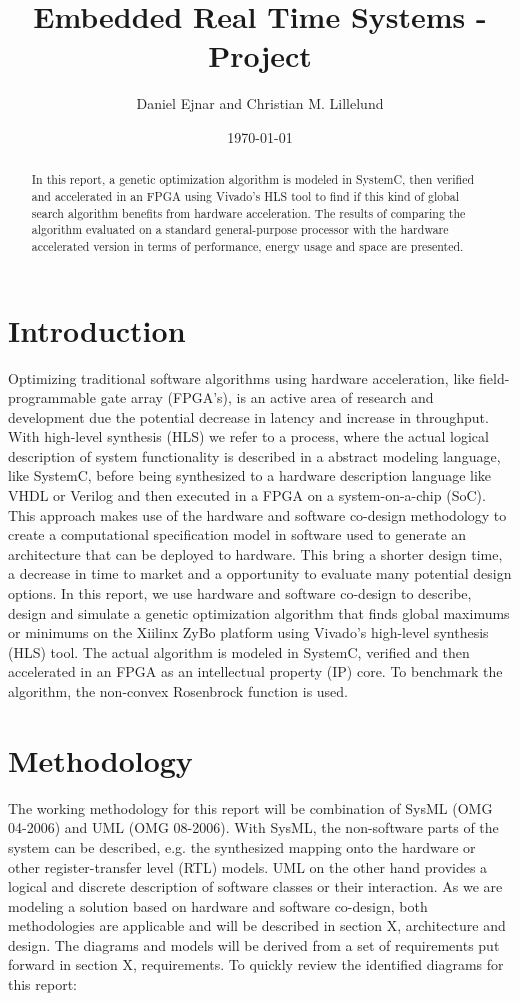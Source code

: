 \documentclass{article}
\title{Embedded Real Time Systems - Project}
\author{Daniel Ejnar and Christian M. Lillelund}
\date{\today}
\begin{document}
\maketitle
\begin{abstract}
	In this report, a genetic optimization algorithm is modeled in SystemC, then verified and accelerated in an FPGA using Vivado's HLS tool to find if this kind of global search algorithm benefits from hardware acceleration. The results of comparing the algorithm evaluated on a standard general-purpose processor with the hardware accelerated version in terms of performance, energy usage and space are presented.
\end{abstract}

\section{Introduction}
Optimizing traditional software algorithms using hardware acceleration, like field-programmable gate array (FPGA's), is an active area of research and development due the potential decrease in latency and increase in throughput. With high-level synthesis (HLS) we refer to a process, where the actual logical description of system functionality is described in a abstract modeling language, like SystemC, before being synthesized to a hardware description language like VHDL or Verilog and then executed in a FPGA on a system-on-a-chip (SoC). This approach makes use of the hardware and software co-design methodology to create a computational specification model in software used to generate an architecture that can be deployed to hardware. This bring a shorter design time, a decrease in time to market and a opportunity to evaluate many potential design options. In this report, we use hardware and software co-design to describe, design and simulate a genetic optimization algorithm that finds global maximums or minimums on the Xiilinx ZyBo platform using Vivado's high-level synthesis (HLS) tool. The actual algorithm is modeled in SystemC, verified and then accelerated in an FPGA as an intellectual property (IP) core. To benchmark the algorithm, the non-convex Rosenbrock function is used.

\section{Methodology}

The working methodology for this report will be combination of SysML (OMG 04-2006) and UML (OMG 08-2006). With SysML, the non-software parts of the system can be described, e.g. the synthesized mapping onto the hardware or other register-transfer level (RTL) models. UML on the other hand provides a logical and discrete description of software classes or their interaction. As we are modeling a solution based on hardware and software co-design, both methodologies are applicable and will be described in section X, architecture and design. The diagrams and models will be derived from a set of requirements put forward in section X, requirements. To quickly review the identified diagrams for this report:
\end{document}
